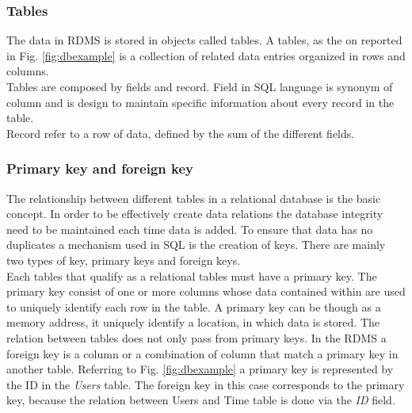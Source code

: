 \documentclass[../main.tex]{subfiles}
\begin{document}
\subsubsection{Tables}
The data in \gls{RDMS} is stored in objects called tables. A tables, as the on reported in Fig. \ref{fig:dbexample} is a collection of related data entries organized in rows and columns.\\
Tables are composed by fields and record. Field in SQL language is synonym of column and is design to maintain specific information about every record in the table.\\
Record refer to a row of data, defined by the sum of the different fields.
\subsubsection{Primary key and foreign key}
The relationship between different tables in a relational database is the basic concept. In order to be effectively create data relations the database integrity need to be maintained each time data is added. To ensure that data has no duplicates a mechanism used in SQL is the creation of keys. There are mainly two types of key, primary keys and foreign keys.\\
Each tables that qualify as a relational tables must have a primary key. The primary key consist of one or more columns whose data contained within are used to uniquely identify each row in the table. A primary key can be though as a memory address, it uniquely identify a location, in which data is stored. The relation between tables does not only pass from primary keys. In the RDMS a foreign key is a column or a combination of column that match a primary key in another table. Referring to Fig. \ref{fig:dbexample} a primary key is represented by the ID in the \textit{Users} table. The foreign key in this case corresponds to the primary key, because the relation between Users and Time table is done via the \textit{ID} field.
\end{document}
